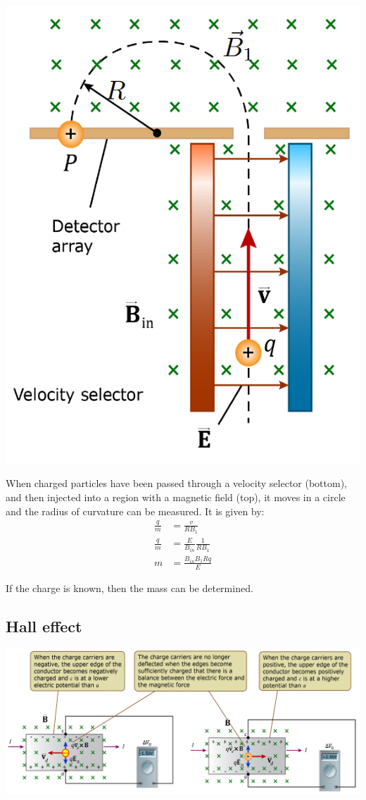 \documentclass[11pt]{article}
\begin{document}
\begin{center}
\includegraphics[scale=0.9]{./images/mass-spectrometer.png}
\end{center}

When charged particles have been passed through a velocity selector (bottom), and then injected into a region with a magnetic field (top), it moves in a circle and the radius of curvature can be measured. It is given by:
\begin{align*}
\frac{q}{m} &= \frac{v}{RB_1} \\
\frac{q}{m} &= \frac{E}{B_{in}} \frac{1}{RB_1} \\
m &= \frac{B_{in} B_1 Rq}{E}
\end{align*}

If the charge is known, then the mass can be determined.

\subsection{Hall effect}
\label{sec:org2ef3700}
\begin{center}
\includegraphics[width=.9\linewidth]{./images/hall-effect.png}
\end{center}
\end{document}
